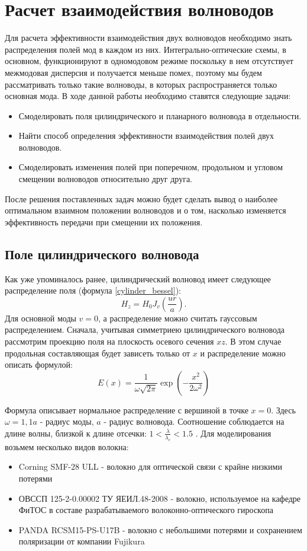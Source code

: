 \chapter{Расчет взаимодействия волноводов}
\label{coupling}

Для расчета эффективности взаимодействия двух волноводов необходимо знать распределения полей мод в каждом из них. Интегрально-оптические схемы, в основном, функционируют в одномодовом режиме поскольку в нем отсутствует межмодовая дисперсия и получается меньше помех, поэтому мы будем рассматривать только такие волноводы, в которых распространяется только основная мода. В ходе данной работы необходимо ставятся следующие задачи:
\begin{itemize}
	\item Смоделировать поля цилиндрического и планарного волновода в отдельности.
	\item Найти способ определения эффективности взаимодействия полей двух волноводов.
	\item Смоделировать изменения полей при поперечном, продольном и угловом смещении волноводов относительно друг друга.
\end{itemize} 
После решения поставленных задач можно будет сделать вывод о наиболее оптимальном взаимном положении волноводов и о том, насколько изменяется эффективность передачи при смещении их положения.

\section{Поле цилиндрического волновода}
\label{cylinder_field}
Как уже упоминалось ранее, цилиндрический волновод имеет следующее распределение поля (формула \ref{cylinder_bessel}):
$$
	H_z = H_0 J_v (\frac{ur}{a}).
$$
Для основной моды $v = 0$, а распределение можно считать гауссовым распределением. Сначала, учитывая  симметриею цилиндрического волновода рассмотрим проекцию поля на плоскость осевого сечения $xz$. В этом случае продольная составляющая будет зависеть только от $x$ и распределение можно описать формулой:
\begin{equation}
  \label{gauss}
  E(x)=\frac{1}{\omega\sqrt{2\pi}}\exp\left(-\frac{x^2}{2\omega^2}\right)
\end{equation}

Формула описывает нормальное распределение с вершиной в точке $x=0$.
Здесь $\omega = 1{,}1a$ - радиус моды, $a$ - радиус волновода. Соотношение соблюдается на длине волны, близкой к длине отсечки: $1 < \frac{\lambda}{\lambda_c} < 1.5$ \cite{lefevre}. Для моделирования возьмем несколько видов волокна:
\begin{itemize}
\item Corning SMF-28 ULL - волокно для оптической связи с крайне низкими потерями
\item ОВССП 125-2-0.00002 ТУ ЯЕИЛ.48-2008 - волокно, используемое на кафедре ФиТОС в составе разрабатываемого волоконно-оптического гироскопа \cite{tu_fog}
\item PANDA RCSM15-PS-U17B - волокно с небольшими потерями и сохранением поляризации от компании Fujikura
\end{itemize}


